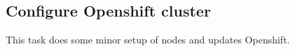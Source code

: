 \subsection{Configure Openshift cluster}\label{subsec:configure-openshift-cluster}

This task does some minor setup of nodes and updates Openshift.
